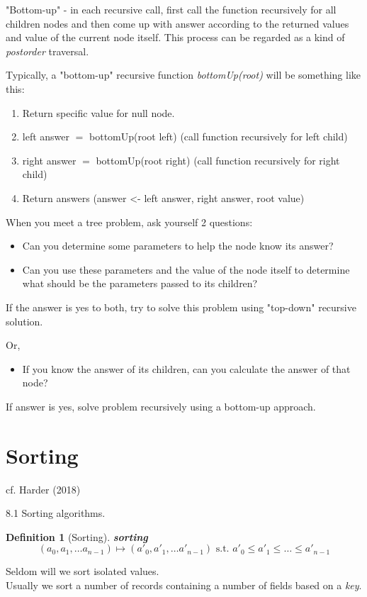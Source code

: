 \documentclass[10pt]{amsart}
\newtheorem{definition}{Definition}
\begin{document}
"Bottom-up" - in each recursive call, first call the function recursively for all children nodes and then come up with answer according to the returned values and value of the current node itself. This process can be regarded as a kind of \emph{postorder} traversal.

Typically, a "bottom-up" recursive function \emph{bottomUp(root)} will be something like this:

\begin{enumerate}
	\item Return specific value for null node.
	\item left answer $=$ bottomUp(root left) (call function recursively for left child)
	\item right answer $=$ bottomUp(root right) (call function recursively for right child)
	\item Return answers (answer <- left answer, right answer, root value)
\end{enumerate}

When you meet a tree problem, ask yourself 2 questions: 
\begin{itemize}
	\item Can you determine some parameters to help the node know its answer?
	\item Can you use these parameters and the value of the node itself to determine what should be the parameters passed to its children?
\end{itemize}
If the answer is yes to both, try to solve this problem using "top-down" recursive solution.

Or,
\begin{itemize}
	\item If you know the answer of its children, can you calculate the answer of that node?
\end{itemize}
If answer is yes, solve problem recursively using a bottom-up approach.



\section{Sorting}

cf. Harder (2018) \cite{Hard2018}

8.1 Sorting algorithms. 

\begin{definition}[Sorting]
	\textbf{sorting}
	\begin{equation}
	(a_0, a_1, \dots a_{n-1}) \mapsto (a'_0, a'_1, \dots a'_{n-1}) \text{ s.t. } a'_0 \leq a'_1 \leq \dots \leq a'_{n-1}
	\end{equation}
\end{definition}
Seldom will we sort isolated values. \\
Usually we sort a number of records containing a number of fields based on a \emph{key}. \\
\end{document}
